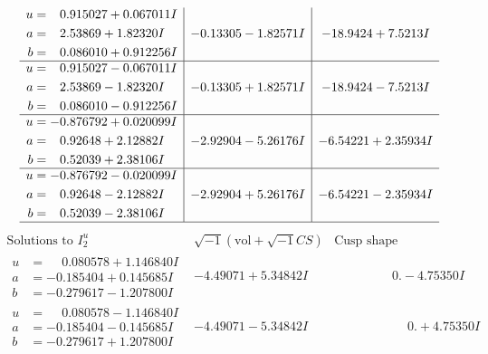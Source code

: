 \documentclass[1p]{elsarticle_modified}
\theoremstyle{definition}
\newcommand{\I}{\sqrt{-1}}
\begin{document}
$$\begin{array}{c|c|c}
\begin{aligned}
u &= \phantom{-}0.915027 + 0.067011 I \\
a &= \phantom{-}2.53869 + 1.82320 I \\
b &= \phantom{-}0.086010 + 0.912256 I\end{aligned}
 & -0.13305 - 1.82571 I & -18.9424 + 7.5213 I \\ \hline\begin{aligned}
u &= \phantom{-}0.915027 - 0.067011 I \\
a &= \phantom{-}2.53869 - 1.82320 I \\
b &= \phantom{-}0.086010 - 0.912256 I\end{aligned}
 & -0.13305 + 1.82571 I & -18.9424 - 7.5213 I \\ \hline\begin{aligned}
u &= -0.876792 + 0.020099 I \\
a &= \phantom{-}0.92648 + 2.12882 I \\
b &= \phantom{-}0.52039 + 2.38106 I\end{aligned}
 & -2.92904 - 5.26176 I & -6.54221 + 2.35934 I \\ \hline\begin{aligned}
u &= -0.876792 - 0.020099 I \\
a &= \phantom{-}0.92648 - 2.12882 I \\
b &= \phantom{-}0.52039 - 2.38106 I\end{aligned}
 & -2.92904 + 5.26176 I & -6.54221 - 2.35934 I\\
 \hline 
 \end{array}$$\newpage$$\begin{array}{c|c|c}  
\text{Solutions to }I^u_{2}& \I (\text{vol} + \sqrt{-1}CS) & \text{Cusp shape}\\
 \hline 
\begin{aligned}
u &= \phantom{-}0.080578 + 1.146840 I \\
a &= -0.185404 + 0.145685 I \\
b &= -0.279617 - 1.207800 I\end{aligned}
 & -4.49071 + 5.34842 I & \phantom{-0.000000 } 0. - 4.75350 I \\ \hline\begin{aligned}
u &= \phantom{-}0.080578 - 1.146840 I \\
a &= -0.185404 - 0.145685 I \\
b &= -0.279617 + 1.207800 I\end{aligned}
 & -4.49071 - 5.34842 I & \phantom{-0.000000 -}0. + 4.75350 I \\ \hline\begin{aligned}

\end{aligned}
\end{array}$$
\end{document}
